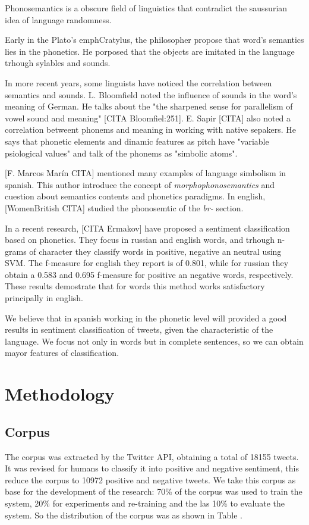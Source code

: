 \documentclass[12pt,journal,compsoc]{IEEEtran}
\begin{document}
Phonosemantics is a obscure field of linguistics that contradict the saussurian idea of language randomness. 

Early in the Plato's emph{Cratylus}, the philosopher propose that word's semantics lies in the phonetics. He porposed that the objects are imitated in the language trhough sylables and sounds.

In more recent years, some linguists have noticed the correlation between semantics and sounds. L. Bloomfield noted the influence of sounds in the word's meaning of German. He talks about the "the sharpened sense for parallelism of vowel sound and meaning" [CITA Bloomfiel:251]. E. Sapir [CITA] also noted a correlation betweent phonems and meaning in working with native sepakers. He says that phonetic elements and dinamic features as pitch have "variable psiological values" and talk of the phonems as "simbolic atoms".

[F. Marcos Marín CITA] mentioned many examples of language simbolism in spanish. This author introduce the concept of \emph{morphophonosemantics} and cuestion about semantics contents and phonetics paradigms. In english, [WomenBritish CITA] studied the phonosemtic of the \emph{br-} section. 

In a recent research, [CITA Ermakov] have proposed a sentiment classification based on phonetics. They focus in russian and english words, and trhough n-grams of character they classify words in positive, negative an neutral using SVM. The f-measure for english they report is of 0.801, while for russian they obtain a 0.583 and 0.695 f-measure for positive an negative words, respectively. These results demostrate that for words this method works satisfactory principally in english.

We believe that in spanish working in the phonetic level will provided a good results in sentiment classification of tweets, given the characteristic of the language. We focus not only in words but in complete sentences, so we can obtain mayor features of classification.

\section{Methodology}
\subsection{Corpus}

The corpus was extracted by the Twitter API, obtaining a total of 18155 tweets. It was revised for humans to classify it into positive and negative sentiment, this reduce the corpus to 10972 positive and negative tweets. We take this corpus as base for the development of the research: 70\% of the corpus was used to train the system, 20\% for experiments and re-training and the las 10\% to evaluate the system. So the distribution of the corpus was as shown in Table \arraystretch.
\end{document}
